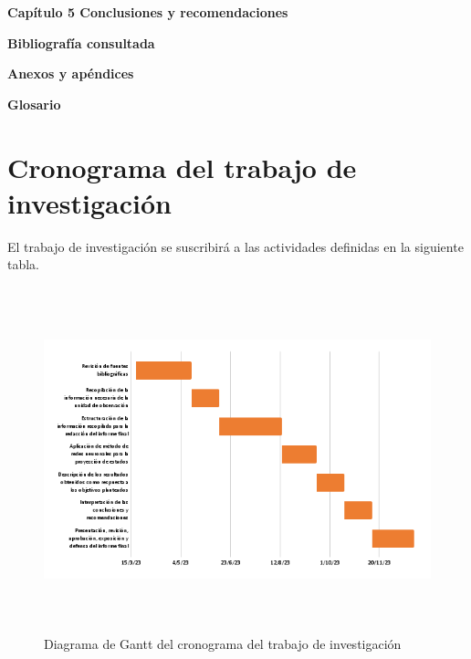 \documentclass[
  12pt,
]{article}
\begin{document}
\vspace{2.5mm}

\textbf{Capítulo 5 Conclusiones y recomendaciones} \vspace{2.5mm}

\vspace{2.5mm}

\textbf{Bibliografía consultada} \vspace{2.5mm}

\vspace{2.5mm}

\textbf{Anexos y apéndices} \vspace{2.5mm}

\vspace{2.5mm}

\textbf{Glosario} \vspace{2.5mm}

\newpage

\newpage

\hypertarget{cronograma-del-trabajo-de-investigaciuxf3n}{%
\section{Cronograma del trabajo de
investigación}\label{cronograma-del-trabajo-de-investigaciuxf3n}}

El trabajo de investigación se suscribirá a las actividades definidas en
la siguiente tabla.



\begin{figure}
\centering
\includegraphics[width=12cm,height=10cm]{RECURSOS-PLAN-DE-INVESTIGACION/013-CRONOGRAMA-DEL-TRABAJO-DE-INVESTIGACION/gantt.png}
\caption{Diagrama de Gantt del cronograma del trabajo de investigación}
\end{figure}
\end{document}
